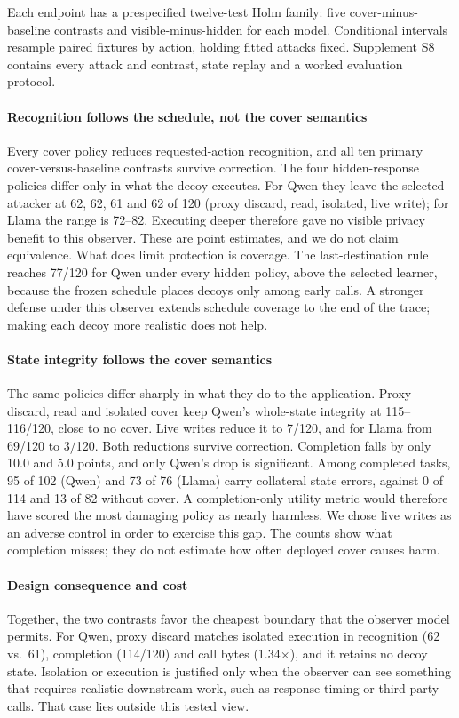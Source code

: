Each endpoint has a prespecified twelve-test Holm family: five cover-minus-baseline contrasts and visible-minus-hidden for each model. Conditional intervals resample paired fixtures by action, holding fitted attacks fixed. Supplement S8 contains every attack and contrast, state replay and a worked evaluation protocol.



\paragraph{Recognition follows the schedule, not the cover semantics}
Every cover policy reduces requested-action recognition, and all ten primary cover-versus-baseline contrasts survive correction. The four hidden-response policies differ only in what the decoy executes. For Qwen they leave the selected attacker at 62, 62, 61 and 62 of 120 (proxy discard, read, isolated, live write); for Llama the range is 72--82. Executing deeper therefore gave no visible privacy benefit to this observer. These are point estimates, and we do not claim equivalence. What does limit protection is coverage. The last-destination rule reaches 77/120 for Qwen under every hidden policy, above the selected learner, because the frozen schedule places decoys only among early calls. A stronger defense under this observer extends schedule coverage to the end of the trace; making each decoy more realistic does not help.

\paragraph{State integrity follows the cover semantics}
The same policies differ sharply in what they do to the application. Proxy discard, read and isolated cover keep Qwen's whole-state integrity at 115--116/120, close to no cover. Live writes reduce it to 7/120, and for Llama from 69/120 to 3/120. Both reductions survive correction. Completion falls by only 10.0 and 5.0 points, and only Qwen's drop is significant. Among completed tasks, 95 of 102 (Qwen) and 73 of 76 (Llama) carry collateral state errors, against 0 of 114 and 13 of 82 without cover. A completion-only utility metric would therefore have scored the most damaging policy as nearly harmless. We chose live writes as an adverse control in order to exercise this gap. The counts show what completion misses; they do not estimate how often deployed cover causes harm.

\paragraph{Design consequence and cost}
Together, the two contrasts favor the cheapest boundary that the observer model permits. For Qwen, proxy discard matches isolated execution in recognition (62 vs.\ 61), completion (114/120) and call bytes (1.34$\times$), and it retains no decoy state. Isolation or execution is justified only when the observer can see something that requires realistic downstream work, such as response timing or third-party calls. That case lies outside this tested view.

